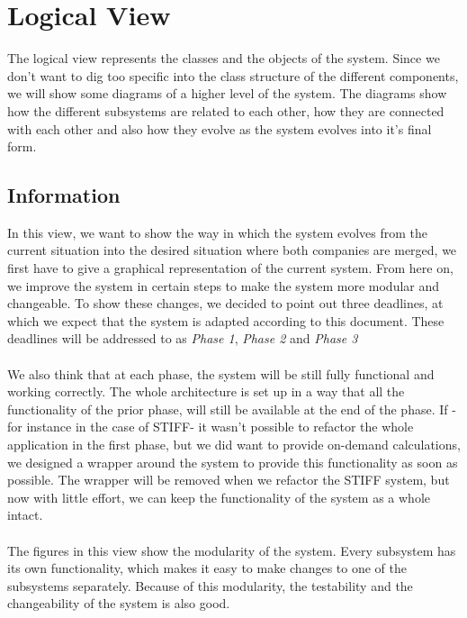 \chapter{Logical View}
The logical view represents the classes and the objects of the system. Since we don't want
to dig too specific into the class structure of the different components, we will show some
diagrams of a higher level of the system. The diagrams show how the different subsystems
are related to each other, how they are connected with each other and also how they evolve
as the system evolves into it's final form.


\section{Information}
In this view, we want to show the way in which the system evolves from the current situation into 
the desired situation where both companies are merged, we first have to give a graphical 
representation of the current system. From here on, we improve the system in certain steps to
make the system more modular and changeable. To show these changes, we decided to point out 
three deadlines, at which we expect that the system is adapted according to this document.
These deadlines will be addressed to as \emph{Phase 1}, \emph{Phase 2} and \emph{Phase 3}\\
 \\
We also think that at each phase, the system will be still fully functional and working correctly.
The whole architecture is set up in a way that all the functionality of the prior phase, will still 
be available at the end of the phase. If -for instance in the case of STIFF- it wasn't possible to 
refactor the whole application in the first phase, but we did want to provide on-demand calculations,
we designed a wrapper around the system to provide this functionality as soon as possible.
The wrapper will be removed when we refactor the STIFF system, but now with little effort, we can
keep the functionality of the system as a whole intact.\\
 \\
The figures in this view show the modularity of the system. Every subsystem has its own
functionality, which makes it easy to make changes to one of the subsystems separately.
Because of this modularity, the testability and the changeability of the system is also good.



